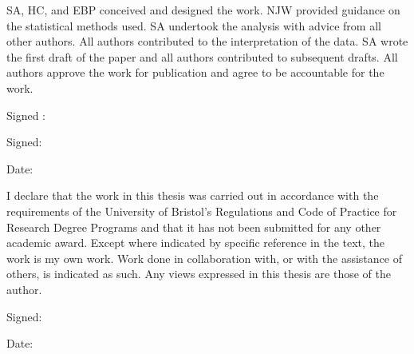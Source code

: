 \documentclass[11pt,twoside]{bristolthesis}
\begin{document}
\begin{contribution}
      \par
      
      SA, HC, and EBP conceived and designed the work. NJW provided guidance on the statistical methods used. SA undertook the analysis with advice from all other authors. All authors contributed to the interpretation of the data. SA wrote the first draft of the paper and all authors contributed to subsequent drafts. All authors approve the work for publication and agree to be accountable for the work.
      
      \par  \vspace{10mm}
      
      Signed :
      
      \par  \vspace{10mm}
      
      Signed:
      
      \par  \vspace{10mm}
      
      Date:
    \end{contribution}
      \begin{declaration}
      I declare that the work in this thesis was carried out in accordance with the requirements of the University of Bristol's Regulations and Code of Practice for Research Degree Programs and that it has not been submitted for any other academic award. Except where indicated by specific reference in the text, the work is my own work. Work done in collaboration with, or with the assistance of others, is indicated as such. Any views expressed in this thesis are those of the author.
      
      \par  \vspace{10mm}
      
      Signed:
      
      \par  \vspace{10mm}
      
      Date:
    \end{declaration}
      \hypersetup{linkcolor=black}
    \setcounter{tocdepth}{2}
    \tableofcontents
  
      \listoftables
  
\end{document}

